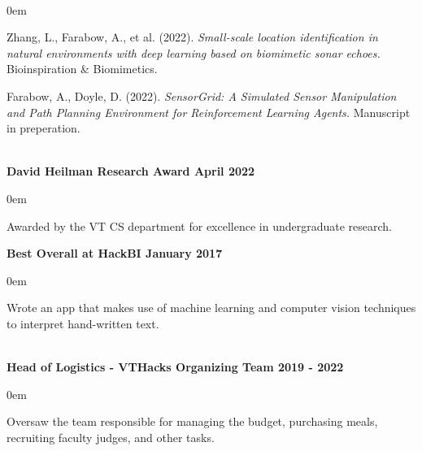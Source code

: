 \documentclass{article}
\begin{document}
\begin{center}
\begin{flushleft}
    {\large\textbf{\underline{}}} \\
    \begin{compactitem}
      \itemsep0em
      \item Zhang, L., Farabow, A., et al. (2022). \emph{Small-scale location identification in natural environments with deep learning based on biomimetic sonar echoes.} Bioinspiration \& Biomimetics. \\
      \item Farabow, A., Doyle, D. (2022). \emph{SensorGrid: A Simulated Sensor Manipulation and Path Planning Environment for Reinforcement Learning Agents.} Manuscript in preperation. 
    \end{compactitem}

    {\large\textbf{\underline{}}} \\
    \textbf{David Heilman Research Award \hfill April 2022}
    \begin{compactitem}
      \itemsep0em
      \item Awarded by the VT CS department for excellence in undergraduate research.
    \end{compactitem}

    \textbf{Best Overall at HackBI \hfill January 2017}
    \begin{compactitem}
      \itemsep0em
      \item Wrote an app that makes use of machine learning and computer vision techniques to interpret hand-written text.
    \end{compactitem}


    {\large\textbf{\underline{}}} \\

    \textbf{Head of Logistics - VTHacks Organizing Team \hfill 2019 - 2022}
    \begin{compactitem}
      \itemsep0em
      \item Oversaw the team responsible for managing the budget, purchasing meals, recruiting faculty judges, and other tasks.
    \end{compactitem}


\end{flushleft}
\end{center}
\end{document}
